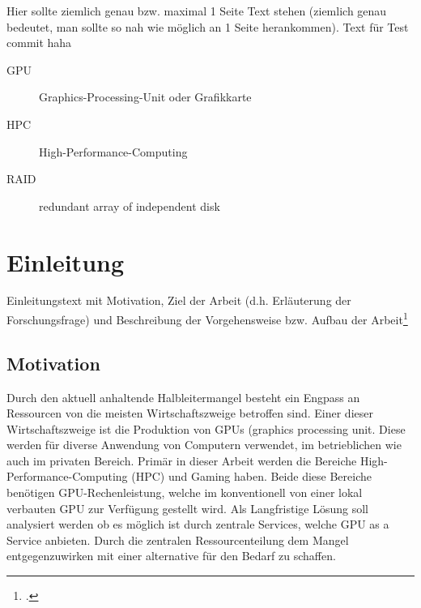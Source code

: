 \documentclass[12pt,toc=bib,toc=listof]{scrreprt}
\title{\topic}
\author{\studentnameA { ({\studentidA)}}, \\ \studentnameB { ({\studentidB)}}, \\ \studentnameC { ({\studentidC)}} }
\date {\semester}
\newcounter{savepage}
\begin{document}
\sffamily
\maketitle

\label{sec:management_summary}

Hier sollte ziemlich genau bzw. maximal 1 Seite Text stehen (ziemlich genau  bedeutet, man sollte so nah wie möglich an 1 Seite herankommen).
Text für Test commit haha


\tableofcontents

\label{sec:abkuerzungsverzeichnis}

\begin{description}
\item[GPU] Graphics-Processing-Unit oder Grafikkarte
\item[HPC] High-Performance-Computing
\item[RAID] redundant array of independent disk
\end{description}


\listoffigures
\listoftables


\newpage

\chapter{Einleitung} %
\label{sec:einleitung}

Einleitungstext mit Motivation, Ziel der Arbeit (d.h. Erläuterung der Forschungsfrage) und Beschreibung der Vorgehensweise bzw. Aufbau der Arbeit\footcite [vgl.] [S. 38]{Th17}

\section{Motivation} %
\label{sec:motivation}
Durch den aktuell anhaltende Halbleitermangel besteht ein Engpass an Ressourcen von die meisten Wirtschaftszweige betroffen sind.
Einer dieser Wirtschaftszweige ist die Produktion von GPUs (graphics processing unit. Diese werden für diverse Anwendung von Computern verwendet, im betrieblichen wie auch im privaten Bereich.
Primär in dieser Arbeit werden die Bereiche High-Performance-Computing (HPC) und Gaming haben.
Beide diese Bereiche benötigen GPU-Rechenleistung, welche im konventionell von einer lokal verbauten GPU zur Verfügung gestellt wird. 
Als Langfristige Lösung soll analysiert werden ob es möglich ist durch zentrale Services, welche GPU as a Service anbieten. 
Durch die zentralen Ressourcenteilung dem Mangel entgegenzuwirken mit einer alternative für den Bedarf zu schaffen.
\end{document}
